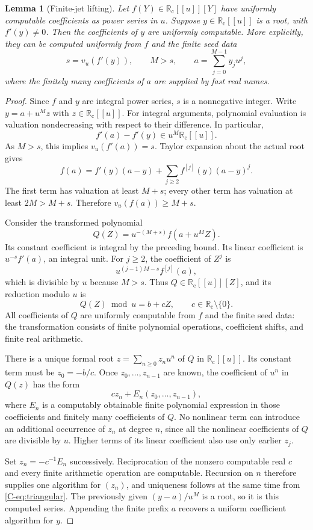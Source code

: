 \documentclass[11pt,letterpaper]{article}
\numberwithin{equation}{section}
\newtheorem{lemma}[theorem]{Lemma}
\theoremstyle{definition}
\theoremstyle{remark}
\newcommand{\Rc}{\mathbb R_{\mathrm c}}
\begin{document}
\begin{lemma}[Finite-jet lifting]
\label{C-lem:finite-jet}
Let $f(Y)\in\Rc[[u]][Y]$ have uniformly computable coefficients as power
series in $u$. Suppose $y\in\Rc[[u]]$ is a root, with
$f'(y)\ne0$. Then the coefficients of $y$ are uniformly computable.
More explicitly, they can be computed uniformly from $f$ and the finite
seed data
\[
 s=v_u(f'(y)),\qquad M>s,\qquad
 a=\sum_{j=0}^{M-1}y_j u^j,
\]
where the finitely many coefficients of $a$ are supplied by fast real names.
\end{lemma}
\begin{proof}
Since $f$ and $y$ are integral power series, $s$ is a nonnegative integer.
Write $y=a+u^Mz$ with $z\in\Rc[[u]]$.
For integral arguments, polynomial evaluation is valuation nondecreasing
with respect to their difference. In particular,
\[
 f'(a)-f'(y)\in u^M\Rc[[u]].
\]
As $M>s$, this implies $v_u(f'(a))=s$.
Taylor expansion about the actual root gives
\[
 f(a)=f'(y)(a-y)+\sum_{j\geq2}f^{[j]}(y)(a-y)^j.
\]
The first term has valuation at least $M+s$; every other term has valuation
at least $2M>M+s$. Therefore $v_u(f(a))\geq M+s$.

Consider the transformed polynomial
\begin{equation}
 Q(Z)=u^{-(M+s)}f(a+u^MZ).
 \label{C-eq:Q-transform}
\end{equation}
Its constant coefficient is integral by the preceding bound. Its linear
coefficient is $u^{-s}f'(a)$, an integral unit. For $j\geq2$, the coefficient
of $Z^j$ is
\[
 u^{(j-1)M-s}f^{[j]}(a),
\]
which is divisible by $u$ because $M>s$. Thus $Q\in\Rc[[u]][Z]$, and its
reduction modulo $u$ is
\begin{equation}
 Q(Z)\bmod u=b+cZ,\qquad c\in\Rc\setminus\{0\}.
 \label{C-eq:Q-mod}
\end{equation}
All coefficients of $Q$ are uniformly computable from $f$ and the finite
seed data: the transformation consists of finite polynomial operations,
coefficient shifts, and finite real arithmetic.

There is a unique formal root $z=\sum_{n\geq0}z_nu^n$ of $Q$ in
$\Rc[[u]]$. Its constant term must be $z_0=-b/c$. Once
$z_0,\ldots,z_{n-1}$ are known, the coefficient of $u^n$ in $Q(z)$ has the
form
\begin{equation}
 c z_n+E_n(z_0,\ldots,z_{n-1}),
 \label{C-eq:triangular}
\end{equation}
where $E_n$ is a computably obtainable finite polynomial expression in those
coefficients and finitely many coefficients of $Q$. No nonlinear term can
introduce an additional occurrence of $z_n$ at degree $n$, since all the
nonlinear coefficients of $Q$ are divisible by $u$. Higher terms of its
linear coefficient also use only earlier $z_j$.

Set $z_n=-c^{-1}E_n$ successively. Reciprocation of the nonzero computable
real $c$ and every finite arithmetic operation are computable. Recursion on
$n$ therefore supplies one algorithm for $(z_n)$, and uniqueness follows at
the same time from \eqref{C-eq:triangular}. The previously given
$(y-a)/u^M$ is a root, so it is this computed series. Appending the finite
prefix $a$ recovers a uniform coefficient algorithm for $y$.
\end{proof}
\end{document}
